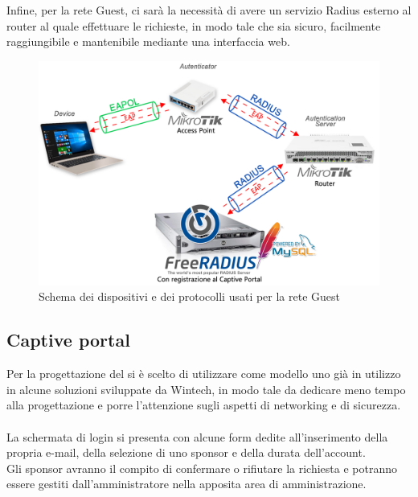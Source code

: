 \documentclass[Realizzazione.tex]{subfiles}
\begin{document}
Infine, per la rete Guest, ci sarà la necessità di avere un servizio Radius esterno al router al quale effettuare le richieste, in modo tale che sia sicuro, facilmente raggiungibile e mantenibile mediante una interfaccia web.
\begin{figure}[H]
	\centering
	\includegraphics[width=1.1\linewidth]{"images/Schema_tecnologie_RADIUS"}
	\caption{Schema dei dispositivi e dei protocolli usati per la rete Guest}
	\label{fig:Schema dei dispositivi e dei protocolli usati per la rete Guest}
\end{figure}

\subsection{Captive portal}
Per la progettazione del  si è scelto di utilizzare come modello uno già in utilizzo in alcune soluzioni sviluppate da Wintech, in modo tale da dedicare meno tempo alla progettazione e porre l'attenzione sugli aspetti di networking e di sicurezza. \\\\
La schermata di login si presenta con alcune form dedite all'inserimento della propria e-mail, della selezione di uno sponsor e della durata dell'account. \\
Gli sponsor avranno il compito di confermare o rifiutare la richiesta e potranno essere gestiti dall'amministratore nella apposita area di amministrazione. \\
\end{document}
